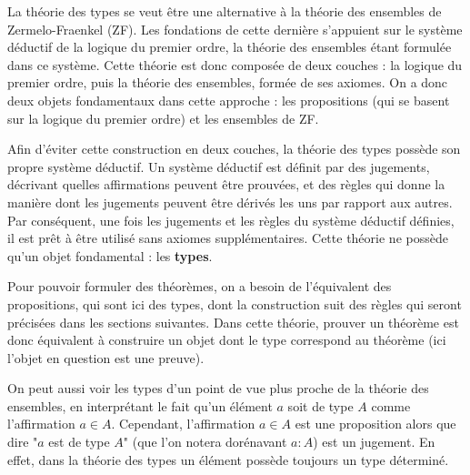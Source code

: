 \documentclass[../../rapport.tex]{subfiles}
\begin{document}
  La théorie des types se veut être une alternative à la théorie des ensembles de Zermelo-Fraenkel (ZF).
  Les fondations de cette dernière s'appuient sur le système déductif de la logique du premier ordre,
  la théorie des ensembles étant formulée dans ce système.
  Cette théorie est donc composée de deux couches :
  la logique du premier ordre, puis la théorie des ensembles, formée de ses axiomes.
  On a donc deux objets fondamentaux dans cette approche :
  les propositions (qui se basent sur la logique du premier ordre) et les ensembles de ZF.


  Afin d'éviter cette construction en deux couches, la théorie des types possède son propre système déductif.
  Un système déductif est définit par des jugements, décrivant quelles affirmations peuvent être prouvées,
  et des règles qui donne la manière dont les jugements peuvent être dérivés les uns par rapport aux autres.
  Par conséquent, une fois les jugements et les règles du système déductif définies,
  il est prêt à être utilisé sans axiomes supplémentaires.
  Cette théorie ne possède qu'un objet fondamental : les \textbf{types}.

  Pour pouvoir formuler des théorèmes, on a besoin de l'équivalent des propositions,
  qui sont ici des types, dont la construction suit des règles qui seront précisées dans les sections suivantes.
  Dans cette théorie, prouver un théorème est donc équivalent à construire un objet
  dont le type correspond au théorème (ici l'objet en question est une preuve).

  On peut aussi voir les types d'un point de vue plus proche de la théorie des ensembles,
  en interprétant le fait qu'un élément $a$ soit de type $A$ comme l'affirmation $a \in A$.
  Cependant, l'affirmation $a \in A$ est une proposition alors que dire "$a$ est de type $A$"
  (que l'on notera dorénavant $a : A$) est un jugement.
  En effet, dans la théorie des types un élément possède toujours un type déterminé.
\end{document}
